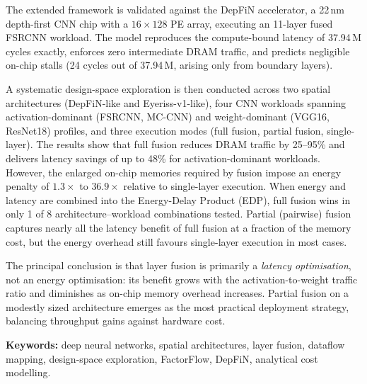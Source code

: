 The extended framework is validated against the DepFiN accelerator, a
22\,nm depth-first CNN chip with a $16 \times 128$ PE array, executing
an 11-layer fused FSRCNN workload.
The model reproduces the compute-bound latency of 37.94\,M cycles
exactly, enforces zero intermediate DRAM traffic, and predicts
negligible on-chip stalls (24 cycles out of 37.94\,M, arising only
from boundary layers).

A systematic design-space exploration is then conducted across two
spatial architectures (DepFiN-like and Eyeriss-v1-like), four CNN
workloads spanning activation-dominant (FSRCNN, MC-CNN) and
weight-dominant (VGG16, ResNet18) profiles, and three execution modes
(full fusion, partial fusion, single-layer).
The results show that full fusion reduces DRAM traffic by 25--95\%
and delivers latency savings of up to 48\% for activation-dominant
workloads.
However, the enlarged on-chip memories required by fusion impose an
energy penalty of $1.3\times$ to $36.9\times$ relative to single-layer
execution.
When energy and latency are combined into the Energy-Delay Product
(EDP), full fusion wins in only 1 of 8 architecture--workload
combinations tested.
Partial (pairwise) fusion captures nearly all the latency benefit of
full fusion at a fraction of the memory cost, but the energy overhead
still favours single-layer execution in most cases.

The principal conclusion is that layer fusion is primarily a
\emph{latency optimisation}, not an energy optimisation: its benefit
grows with the activation-to-weight traffic ratio and diminishes as
on-chip memory overhead increases.
Partial fusion on a modestly sized architecture emerges as the most
practical deployment strategy, balancing throughput gains against
hardware cost.

\vspace{1em}
\noindent\textbf{Keywords:} deep neural networks, spatial architectures,
layer fusion, dataflow mapping, design-space exploration, FactorFlow,
DepFiN, analytical cost modelling.
